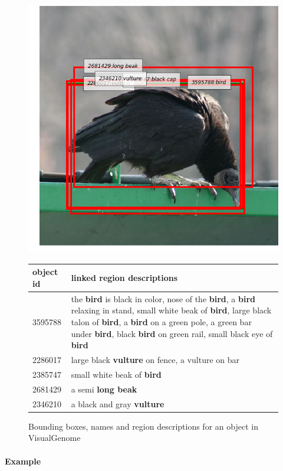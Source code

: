 \begin{figure}
\begin{center}
\includegraphics[scale=0.4]{figures/vulture.png} 
\begin{tabular}{lp{6cm}}
object id & linked region descriptions\\
\hline
3595788 & the \textbf{bird} is black in color, nose of the \textbf{bird}, a \textbf{bird} relaxing in stand, small white beak of \textbf{bird}, large black talon of \textbf{bird}, a \textbf{bird} on a green pole, a green bar under \textbf{bird}, black \textbf{bird} on green rail, small black eye of \textbf{bird}\\
2286017 & large black \textbf{vulture} on fence, a vulture on bar\\
2385747 & small white beak of \textbf{bird}\\
2681429 & a semi \textbf{long beak}\\  
2346210 & a black and gray \textbf{vulture}\\
 \end{tabular}
\caption{Bounding boxes, names and region descriptions for an object in VisualGenome}
\label{fig:bird}
\end{center}
\end{figure}

\paragraph{Example}

